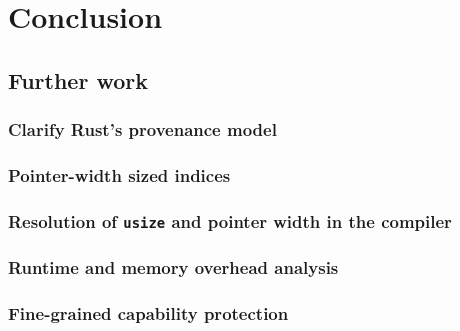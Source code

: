 \documentclass[dissertation.tex]{subfiles}
\begin{document}
\chapter{Conclusion}


\section{Further work}

\subsection{Clarify Rust's provenance model}

\subsection{Pointer-width sized indices}

\subsection{Resolution of \texttt{usize} and pointer width in the compiler}

\subsection{Runtime and memory overhead analysis}

\subsection{Fine-grained capability protection}
\end{document}
